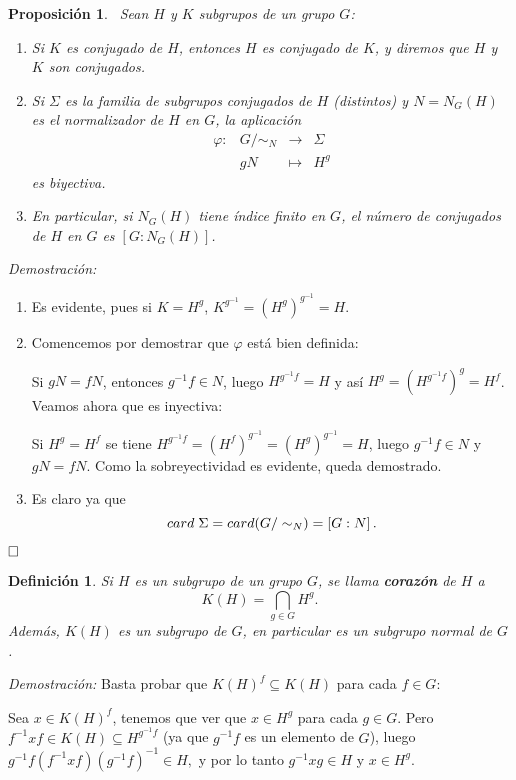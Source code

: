 \documentclass[12pt]{article}
\newtheorem{proposition}[theorem]{Proposición}
\newtheorem{definition}[theorem]{Definición}
\begin{document}
\begin{proposition}~\label{eq:conjug}Sean $H$ y $K$ subgrupos de un grupo $G$:
\begin{enumerate}
\item Si $K$ es conjugado de $H$, entonces $H$ es conjugado de $K$, y diremos que $H$ y $K$ son \textit{conjugados}.
\item Si $\Sigma$ es la familia de subgrupos conjugados de $H$ (distintos) y $N = N_{G}(H)$ es el normalizador de $H$ en $G$, la aplicación $$
\begin{array}{rccl}
\varphi \colon &G/\sim_{N} & \longrightarrow & \Sigma\\
&gN & \longmapsto &H^{g}
\end{array}
$$ es biyectiva.
\item En particular, si $N_{G}(H)$ tiene índice finito en $G$, el número de conjugados de $H$ en $G$ es $\left[ G:N_{G}(H) \right]$.
\end{enumerate}
\end{proposition}
\emph{Demostración: }\begin{enumerate}
\item Es evidente, pues si $K = H^{g}$, $K^{g^{-1}} =(H^{g})^{g^{-1}} = H$.
\item Comencemos por demostrar que $\varphi$ está bien definida:

Si $gN = fN$, entonces $g^{-1}f \in N$, luego $H^{g^{-1}f} = H$ y así $H^{g} = (H^{g^{-1}f})^{g} = H^{f}$. Veamos ahora que es inyectiva: 

Si $H^{g} = H^{f}$ se tiene $H^{g^{-1}f} = (H^{f})^{g^{-1}} = (H^{g})^{g^{-1}} = H$, luego $g^{-1}f \in N$ y $gN = fN.$ Como la sobreyectividad es evidente, queda demostrado.
\item  Es claro ya que $$card\hspace{0.1cm} \Sigma = card(G/\sim_{N}) = \left[ G:N \right].$$
\end{enumerate}
$\hfill \square$

\begin{definition}Si $H$ es un subgrupo de un grupo $G$, se llama \textbf{corazón} de $H$ a $$K(H) = \bigcap_{g \in G} H^{g}. \label{eq:corazon}$$ Además, $K(H)$ es un subgrupo de $G$, en particular es un subgrupo normal de $G$.
\end{definition}
\emph{Demostración: }Basta probar que $K(H)^{f} \subseteq K(H)$ para cada $f \in G$:

Sea $x \in K(H)^{f}$, tenemos que ver que $x \in H^{g}$ para cada $g \in G$. Pero $
f^{-1}xf \in K(H) \subseteq H^{g^{-1}f}$ (ya que $g^{-1}f$ es un elemento de $G$), luego $g^{-1}f(f^{-1}xf)(g^{-1}f)^{-1} \in H,$ y por lo tanto $g^{-1}xg \in H$ y $x\in H^{g}$.
\end{document}
